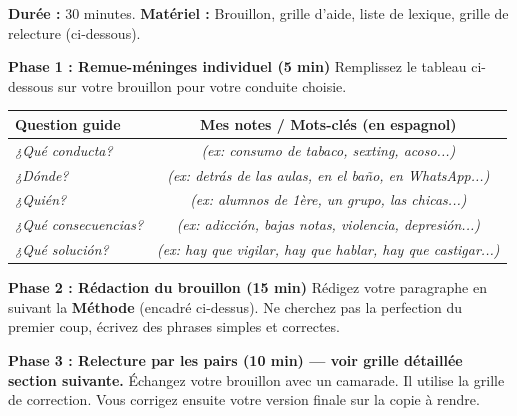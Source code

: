 \documentclass[11pt]{article}
\newcommand{\esp}[1]{\ifmmode\text{\textit{#1}}\else\begingroup\selectlanguage{spanish}\itshape #1\endgroup\fi}
\begin{document}
\begin{experience}
\textbf{Durée :} 30 minutes. \textbf{Matériel :} Brouillon, grille d'aide, liste de lexique, grille de relecture (ci-dessous).

\textbf{Phase 1 : Remue-méninges individuel (5 min)}
Remplissez le tableau ci-dessous sur votre brouillon pour votre conduite choisie.

\begin{center}
\begin{tabularx}{\linewidth}{|X|c|}
\hline
\rowcolor{poporangeL} \textbf{Question guide} & \textbf{Mes notes / Mots-clés (en espagnol)} \\
\hline
\esp{¿Qué conducta?} & \textit{(ex: consumo de tabaco, sexting, acoso...)} \\
\hline
\esp{¿Dónde?} & \textit{(ex: detrás de las aulas, en el baño, en WhatsApp...)} \\
\hline
\esp{¿Quién?} & \textit{(ex: alumnos de 1ère, un grupo, las chicas...)} \\
\hline
\esp{¿Qué consecuencias?} & \textit{(ex: adicción, bajas notas, violencia, depresión...)} \\
\hline
\esp{¿Qué solución?} & \textit{(ex: hay que vigilar, hay que hablar, hay que castigar...)} \\
\hline
\end{tabularx}
\end{center}

\textbf{Phase 2 : Rédaction du brouillon (15 min)}
Rédigez votre paragraphe en suivant la \textbf{Méthode} (encadré ci-dessus). Ne cherchez pas la perfection du premier coup, écrivez des phrases simples et correctes.

\textbf{Phase 3 : Relecture par les pairs (10 min) — voir grille détaillée section suivante.}
Échangez votre brouillon avec un camarade. Il utilise la grille de correction. Vous corrigez ensuite votre version finale sur la copie à rendre.
\end{experience}
\end{document}
